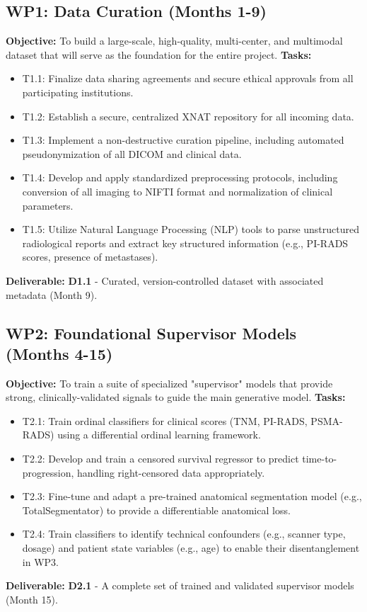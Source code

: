 \documentclass[11pt, a4paper]{article}
\begin{document}
\subsection*{WP1: Data Curation (Months 1-9)}
\textbf{Objective:} To build a large-scale, high-quality, multi-center, and multimodal dataset that will serve as the foundation for the entire project.
\textbf{Tasks:}
\begin{itemize}
    \item T1.1: Finalize data sharing agreements and secure ethical approvals from all participating institutions.
    \item T1.2: Establish a secure, centralized XNAT repository for all incoming data.
    \item T1.3: Implement a non-destructive curation pipeline, including automated pseudonymization of all DICOM and clinical data.
    \item T1.4: Develop and apply standardized preprocessing protocols, including conversion of all imaging to NIFTI format and normalization of clinical parameters.
    \item T1.5: Utilize Natural Language Processing (NLP) tools to parse unstructured radiological reports and extract key structured information (e.g., PI-RADS scores, presence of metastases).
\end{itemize}
\textbf{Deliverable:} \textbf{D1.1} - Curated, version-controlled dataset with associated metadata (Month 9).

\subsection*{WP2: Foundational Supervisor Models (Months 4-15)}
\textbf{Objective:} To train a suite of specialized "supervisor" models that provide strong, clinically-validated signals to guide the main generative model.
\textbf{Tasks:}
\begin{itemize}
    \item T2.1: Train ordinal classifiers for clinical scores (TNM, PI-RADS, PSMA-RADS) using a differential ordinal learning framework.
    \item T2.2: Develop and train a censored survival regressor to predict time-to-progression, handling right-censored data appropriately.
    \item T2.3: Fine-tune and adapt a pre-trained anatomical segmentation model (e.g., TotalSegmentator) to provide a differentiable anatomical loss.
    \item T2.4: Train classifiers to identify technical confounders (e.g., scanner type, dosage) and patient state variables (e.g., age) to enable their disentanglement in WP3.
\end{itemize}
\textbf{Deliverable:} \textbf{D2.1} - A complete set of trained and validated supervisor models (Month 15).
\end{document}
